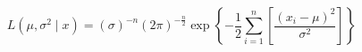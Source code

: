 \begin{equation}
    L
	\left(
	\mu,
	\sigma^2
	\mid
	x
	\right)
	=
	\left(
	\sigma
	\right)^{-n}
	\left(
	2
	\pi
	\right)^{
	-
	\frac{
	n
	}{
	2
	}
	}
	\exp
	\left\{
	-
	\frac{1}{2}
	\sum_{i = 1}^{n}
	\left[
	\frac{
		\left( 
		x_i 
		- 
		\mu 
		\right)^2
	}
	{
		\sigma^2
	}
	\right]
	\right\}
	\label{eq:multiNorm-n-likelihood}
\end{equation}